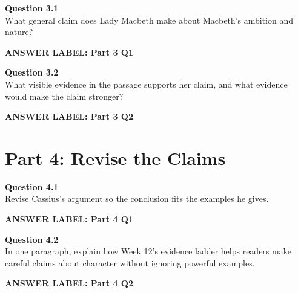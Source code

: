 \documentclass[12pt]{article}
\newcommand{\answerbox}[2]{%
\vspace{0.12em}
\noindent\textbf{#1}\par
\vspace{0.04em}
\noindent\fbox{%
\begin{minipage}[t][#2]{\dimexpr\textwidth-2\fboxsep-2\fboxrule}
\rule{\textwidth}{0pt}
\vspace{#2}
\end{minipage}}
\par\vspace{0.22em}}
\begin{document}
\textbf{Question 3.1}\\[-0.15em]
What general claim does Lady Macbeth make about Macbeth's ambition and nature?

\answerbox{ANSWER LABEL: Part 3 Q1}{2.35in}

\textbf{Question 3.2}\\[-0.15em]
What visible evidence in the passage supports her claim, and what evidence would make the claim stronger?

\answerbox{ANSWER LABEL: Part 3 Q2}{2.55in}

\newpage

\section*{Part 4: Revise the Claims}

\textbf{Question 4.1}\\[-0.15em]
Revise Cassius's argument so the conclusion fits the examples he gives.

\answerbox{ANSWER LABEL: Part 4 Q1}{2.45in}

\textbf{Question 4.2}\\[-0.15em]
In one paragraph, explain how Week 12's evidence ladder helps readers make careful claims about character without ignoring powerful examples.

\answerbox{ANSWER LABEL: Part 4 Q2}{2.45in}
\end{document}

